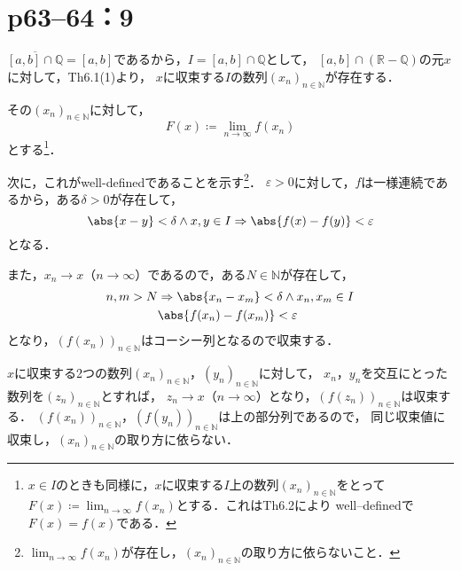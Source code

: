 \section*{p63--64：9}


\begin{tproof}
    $\overline{[a,b] \cap \mathbb{Q}}=[a,b]$であるから，$I=[a,b] \cap \mathbb{Q}$として，
    $[a,b] \cap (\mathbb{R}-\mathbb{Q})$の元$x$に対して，Th6.1(1)より，
    $x$に収束する$I$の数列$(x_n)_{n \in \mathbb{N}}$が存在する．

    その$(x_n)_{n \in \mathbb{N}}$に対して，
    \[
        F(x)\coloneqq \lim_{n \to \infty} f(x_n)
    \]
    とする\footnote{$x \in I$のときも同様に，$x$に収束する$I$上の数列$(x_n)_{n \in \mathbb{N}}$をとって$F(x)\coloneqq \lim_{n \to \infty} f(x_n)$とする．これはTh6.2により well--definedで$F(x)=f(x)$である．}．

    次に，これがwell-definedであることを示す\footnote{$\lim_{n \to \infty} f(x_n)$が存在し，$(x_n)_{n \in \mathbb{N}}$の取り方に依らないこと．}．
    $\varepsilon >0$に対して，$f$は一様連続であるから，ある$\delta >0$が存在して，
    \[
        \abs{x-y}<\delta \land x,y \in I \Rightarrow \abs{f(x)-f(y)}<\varepsilon
    \]
    となる．

    また，$x_n \to x$（$n \to \infty$）であるので，ある$N \in \mathbb{N}$が存在して，
    \begin{align*}
        n, m > N & \Rightarrow \abs{x_n-x_m}<\delta \land x_n,x_m \in I \\
                 & \abs{f(x_n)-f(x_m)}<\varepsilon
    \end{align*}
    となり，$(f(x_n))_{n \in \mathbb{N}}$はコーシー列となるので収束する．

    $x$に収束する2つの数列$(x_n)_{n \in \mathbb{N}}$，$(y_n)_{n \in \mathbb{N}}$に対して，
    $x_n$，$y_n$を交互にとった数列を$(z_n)_{n \in \mathbb{N}}$とすれば，
    $z_n \to x$（$n \to \infty$）となり，$(f(z_n))_{n \in \mathbb{N}}$は収束する．
    $(f(x_n))_{n \in \mathbb{N}}$，$(f(y_n))_{n \in \mathbb{N}}$は上の部分列であるので，
    同じ収束値に収束し，$(x_n)_{n \in \mathbb{N}}$の取り方に依らない．
\end{tproof}

